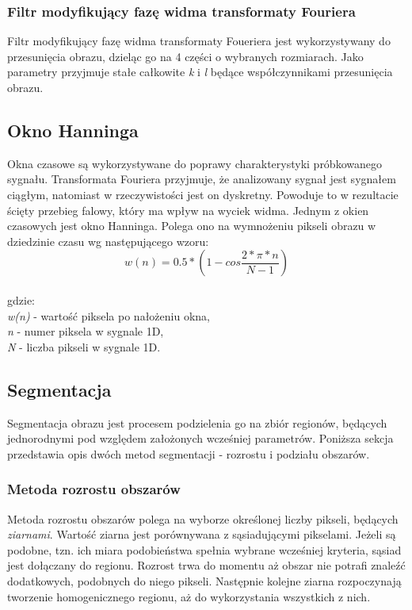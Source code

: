 \documentclass{classrep}
\begin{document}
\subsubsection{Filtr modyfikujący fazę widma transformaty Fouriera}
Filtr modyfikujący fazę widma transformaty Foueriera jest wykorzystywany do przesunięcia obrazu, dzieląc go na 4 części o wybranych rozmiarach. Jako parametry przyjmuje stałe całkowite \textit{k} i \textit{l} będące współczynnikami przesunięcia obrazu.

\subsection{Okno Hanninga}
Okna czasowe są wykorzystywane do poprawy charakterystyki próbkowanego sygnału. Transformata Fouriera przyjmuje, że analizowany sygnał jest sygnałem ciągłym, natomiast w rzeczywistości jest on dyskretny. Powoduje to w rezultacie ścięty przebieg falowy, który ma wpływ na wyciek widma. Jednym z okien czasowych jest okno Hanninga. Polega ono na wymnożeniu pikseli obrazu w dziedzinie czasu wg następującego wzoru:\\
\[ w(n) = 0.5 * (1 - cos \frac{2 \ast \pi \ast n}{N - 1}) \]
\\
gdzie:\\
\textit{w(n)} - wartość piksela po nałożeniu okna,\\
\textit{n} - numer piksela w sygnale 1D,\\
\textit{N} - liczba pikseli w sygnale 1D.\\

\subsection{Segmentacja}
Segmentacja obrazu jest procesem podzielenia go na zbiór regionów, będących jednorodnymi pod względem założonych wcześniej parametrów. Poniższa sekcja przedstawia opis dwóch metod segmentacji - rozrostu i podziału obszarów.

\subsubsection{Metoda rozrostu obszarów}
Metoda rozrostu obszarów polega na wyborze określonej liczby pikseli, będących \textit{ziarnami}. Wartość ziarna jest porównywana z sąsiadującymi pikselami. Jeżeli są podobne, tzn. ich miara podobieństwa spełnia wybrane wcześniej kryteria, sąsiad jest dołączany do regionu. Rozrost trwa do momentu aż obszar nie potrafi znaleźć dodatkowych, podobnych do niego pikseli. Następnie kolejne ziarna rozpoczynają tworzenie homogenicznego regionu, aż do wykorzystania wszystkich z nich. 
\end{document}
